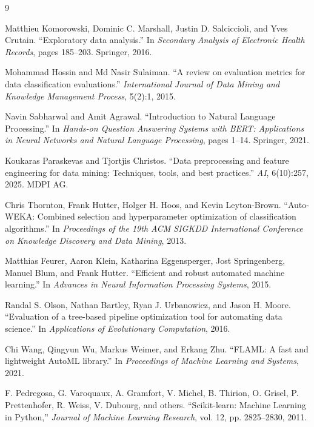 \documentclass[12pt,a4paper]{report}
\begin{document}
\renewcommand{\bibname}{Reference}
\begin{thebibliography}{9}

Matthieu Komorowski, Dominic C. Marshall, Justin D. Salciccioli, and Yves
Crutain. ``Exploratory data analysis.'' In \emph{Secondary Analysis of
Electronic Health Records}, pages 185--203. Springer, 2016.

Mohammad Hossin and Md Nasir Sulaiman. ``A review on evaluation metrics for
data classification evaluations.'' \emph{International Journal of Data Mining
and Knowledge Management Process}, 5(2):1, 2015.

Navin Sabharwal and Amit Agrawal. ``Introduction to Natural Language
Processing.'' In \emph{Hands-on Question Answering Systems with BERT:
Applications in Neural Networks and Natural Language Processing}, pages 1--14.
Springer, 2021.

Koukaras Paraskevas and Tjortjis Christos. ``Data preprocessing and feature
engineering for data mining: Techniques, tools, and best practices.''
\emph{AI}, 6(10):257, 2025. MDPI AG.

Chris Thornton, Frank Hutter, Holger H. Hoos, and Kevin Leyton-Brown.
``Auto-WEKA: Combined selection and hyperparameter optimization of
classification algorithms.'' In \emph{Proceedings of the 19th ACM SIGKDD
International Conference on Knowledge Discovery and Data Mining}, 2013.

Matthias Feurer, Aaron Klein, Katharina Eggensperger, Jost Springenberg,
Manuel Blum, and Frank Hutter. ``Efficient and robust automated machine
learning.'' In \emph{Advances in Neural Information Processing Systems}, 2015.

Randal S. Olson, Nathan Bartley, Ryan J. Urbanowicz, and Jason H. Moore.
``Evaluation of a tree-based pipeline optimization tool for automating data
science.'' In \emph{Applications of Evolutionary Computation}, 2016.

Chi Wang, Qingyun Wu, Markus Weimer, and Erkang Zhu. ``FLAML: A fast and
lightweight AutoML library.'' In \emph{Proceedings of Machine Learning and
Systems}, 2021.

F. Pedregosa, G. Varoquaux, A. Gramfort, V. Michel, B. Thirion,
O. Grisel, P. Prettenhofer, R. Weiss, V. Dubourg, and others.
``Scikit-learn: Machine Learning in Python,''
\textit{Journal of Machine Learning Research}, vol. 12, pp. 2825--2830, 2011.


\end{thebibliography}
\end{document}
